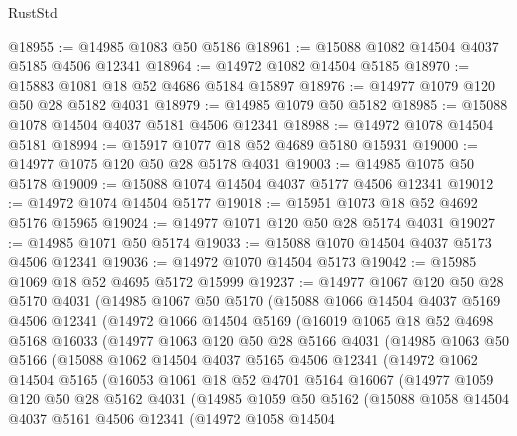 \begin{lexlean}{RustStd}
\begin{coremodule}
@18955 := @14985 @1083 @50 @5186
@18961 := @15088 @1082 @14504 @4037 @5185 @4506 @12341
@18964 := @14972 @1082 @14504 @5185
@18970 := @15883 @1081 @18 @52 @4686 @5184 @15897
@18976 := @14977 @1079 @120 @50 @28 @5182 @4031
@18979 := @14985 @1079 @50 @5182
@18985 := @15088 @1078 @14504 @4037 @5181 @4506 @12341
@18988 := @14972 @1078 @14504 @5181
@18994 := @15917 @1077 @18 @52 @4689 @5180 @15931
@19000 := @14977 @1075 @120 @50 @28 @5178 @4031
@19003 := @14985 @1075 @50 @5178
@19009 := @15088 @1074 @14504 @4037 @5177 @4506 @12341
@19012 := @14972 @1074 @14504 @5177
@19018 := @15951 @1073 @18 @52 @4692 @5176 @15965
@19024 := @14977 @1071 @120 @50 @28 @5174 @4031
@19027 := @14985 @1071 @50 @5174
@19033 := @15088 @1070 @14504 @4037 @5173 @4506 @12341
@19036 := @14972 @1070 @14504 @5173
@19042 := @15985 @1069 @18 @52 @4695 @5172 @15999
@19237 := @14977
    @1067
    @120
    @50
    @28
    @5170
    @4031
    (@14985
      @1067
      @50
      @5170
      (@15088
        @1066
        @14504
        @4037
        @5169
        @4506
        @12341
        (@14972
          @1066
          @14504
          @5169
          (@16019
            @1065
            @18
            @52
            @4698
            @5168
            @16033
            (@14977
              @1063
              @120
              @50
              @28
              @5166
              @4031
              (@14985
                @1063
                @50
                @5166
                (@15088
                  @1062
                  @14504
                  @4037
                  @5165
                  @4506
                  @12341
                  (@14972
                    @1062
                    @14504
                    @5165
                    (@16053
                      @1061
                      @18
                      @52
                      @4701
                      @5164
                      @16067
                      (@14977
                        @1059
                        @120
                        @50
                        @28
                        @5162
                        @4031
                        (@14985
                          @1059
                          @50
                          @5162
                          (@15088
                            @1058
                            @14504
                            @4037
                            @5161
                            @4506
                            @12341
                            (@14972
                              @1058
                              @14504

\end{coremodule}
\end{lexlean}
